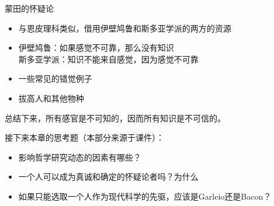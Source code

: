 \begin{fancybox}{蒙田的怀疑论}
\begin{itemize}
    \item 与恩皮理科类似，借用伊壁鸠鲁和斯多亚学派的两方的资源
    \item 伊壁鸠鲁：如果感觉不可靠，那么没有知识\\斯多亚学派：知识不能来自感觉，因为感觉不可靠
    \item 一些常见的错觉例子
    \item 拔高人和其他物种
\end{itemize}
总结下来，所有感官是不可知的，因而所有知识是不可信的。
\end{fancybox}

接下来本章的思考题（本部分来源于课件）：

\begin{itemize}
    \item 影响哲学研究动态的因素有哪些？
    \item 一个人可以成为真诚和确定的怀疑论者吗？为什么
    \item 如果只能选取一个人作为现代科学的先驱，应该是Garleio还是Bacon？
\end{itemize}

